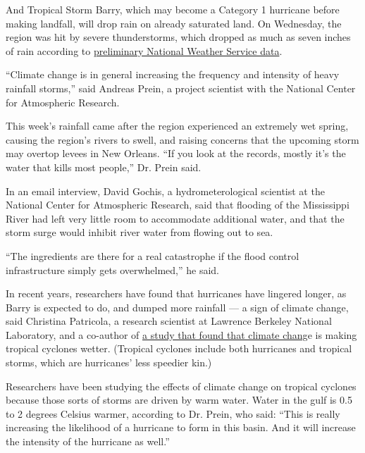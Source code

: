 And Tropical Storm Barry, which may become a Category 1 hurricane before
making landfall, will drop rain on already saturated land. On Wednesday,
the region was hit by severe thunderstorms, which dropped as much as
seven inches of rain according to
\href{https://w2.weather.gov/climate/getclimate.php?date=\&wfo=lix\&sid=LA\&pil=RTPxx\&recent=yes\&specdate=2019-07-11+00\%3A34\%3A52}{preliminary
National Weather Service data}.

``Climate change is in general increasing the frequency and intensity of
heavy rainfall storms,'' said Andreas Prein, a project scientist with
the National Center for Atmospheric Research.

This week's rainfall came after the region experienced an extremely wet
spring, causing the region's rivers to swell, and raising concerns that
the upcoming storm may overtop levees in New Orleans. ``If you look at
the records, mostly it's the water that kills most people,'' Dr. Prein
said.

In an email interview, David Gochis, a hydrometerological scientist at
the National Center for Atmospheric Research, said that flooding of the
Mississippi River had left very little room to accommodate additional
water, and that the storm surge would inhibit river water from flowing
out to sea.

``The ingredients are there for a real catastrophe if the flood control
infrastructure simply gets overwhelmed,'' he said.

In recent years, researchers have found that hurricanes have lingered
longer, as Barry is expected to do, and dumped more rainfall --- a sign
of climate change, said Christina Patricola, a research scientist at
Lawrence Berkeley National Laboratory, and a co-author of
\href{https://www.nature.com/articles/s41586-018-0673-2}{a study that
found that climate chang}e is making tropical cyclones wetter. (Tropical
cyclones include both hurricanes and tropical storms, which are
hurricanes' less speedier kin.)

Researchers have been studying the effects of climate change on tropical
cyclones because those sorts of storms are driven by warm water. Water
in the gulf is 0.5 to 2 degrees Celsius warmer, according to Dr. Prein,
who said: ``This is really increasing the likelihood of a hurricane to
form in this basin. And it will increase the intensity of the hurricane
as well.''

\href{https://www.nytimes.com/section/climate?action=click\&pgtype=Article\&state=default\&region=MAIN_CONTENT_1\&context=storylines_keepup}{}

